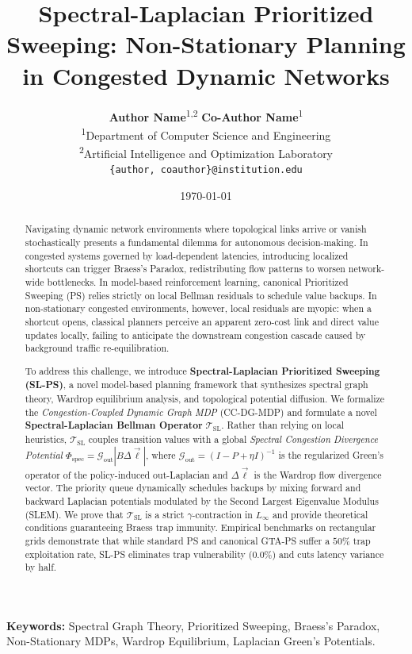 \documentclass[11pt,a4paper]{article}
\title{\textbf{Spectral-Laplacian Prioritized Sweeping: Non-Stationary Planning in Congested Dynamic Networks}}
\author{
  \textbf{Author Name}\textsuperscript{1,2} \quad \textbf{Co-Author Name}\textsuperscript{1} \\
  \textsuperscript{1}Department of Computer Science and Engineering \\
  \textsuperscript{2}Artificial Intelligence and Optimization Laboratory \\
  \texttt{\{author, coauthor\}@institution.edu}
}
\date{\today}
\begin{document}
\maketitle

\begin{abstract}
Navigating dynamic network environments where topological links arrive or vanish stochastically presents a fundamental dilemma for autonomous decision-making. In congested systems governed by load-dependent latencies, introducing localized shortcuts can trigger Braess's Paradox, redistributing flow patterns to worsen network-wide bottlenecks. In model-based reinforcement learning, canonical Prioritized Sweeping (PS) relies strictly on local Bellman residuals to schedule value backups. In non-stationary congested environments, however, local residuals are myopic: when a shortcut opens, classical planners perceive an apparent zero-cost link and direct value updates locally, failing to anticipate the downstream congestion cascade caused by background traffic re-equilibration.

To address this challenge, we introduce \textbf{Spectral-Laplacian Prioritized Sweeping (SL-PS)}, a novel model-based planning framework that synthesizes spectral graph theory, Wardrop equilibrium analysis, and topological potential diffusion. We formalize the \textit{Congestion-Coupled Dynamic Graph MDP} (CC-DG-MDP) and formulate a novel \textbf{Spectral-Laplacian Bellman Operator} $\mathcal{T}_{\text{SL}}$. Rather than relying on local heuristics, $\mathcal{T}_{\text{SL}}$ couples transition values with a global \textit{Spectral Congestion Divergence Potential} $\Phi_{\text{spec}} = \mathcal{G}_{\text{out}} |B \Delta \vec{\ell}|$, where $\mathcal{G}_{\text{out}} = (I - P + \eta I)^{-1}$ is the regularized Green's operator of the policy-induced out-Laplacian and $\Delta \vec{\ell}$ is the Wardrop flow divergence vector. The priority queue dynamically schedules backups by mixing forward and backward Laplacian potentials modulated by the Second Largest Eigenvalue Modulus (SLEM). We prove that $\mathcal{T}_{\text{SL}}$ is a strict $\gamma$-contraction in $L_\infty$ and provide theoretical conditions guaranteeing Braess trap immunity. Empirical benchmarks on rectangular grids demonstrate that while standard PS and canonical GTA-PS suffer a $50\%$ trap exploitation rate, SL-PS eliminates trap vulnerability ($0.0\%$) and cuts latency variance by half.
\end{abstract}

\vspace{0.5em}
\noindent\textbf{Keywords:} Spectral Graph Theory, Prioritized Sweeping, Braess's Paradox, Non-Stationary MDPs, Wardrop Equilibrium, Laplacian Green's Potentials.
\end{document}
